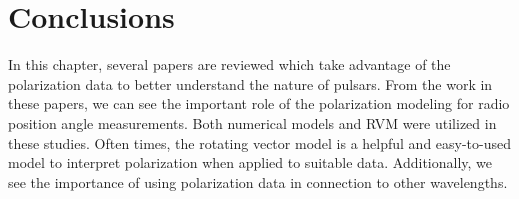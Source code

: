 





\section{Conclusions}

In this chapter, several papers are reviewed which take advantage of the 
polarization data to better understand the nature of pulsars.
From the work in these papers, we can see the important role of 
the polarization modeling for radio position angle measurements. 
Both numerical models and RVM were utilized in these studies.
Often times, the rotating vector model is a helpful and easy-to-used model to
interpret
polarization when applied to suitable data.
Additionally, we see the importance of using polarization data in
connection to other wavelengths.
